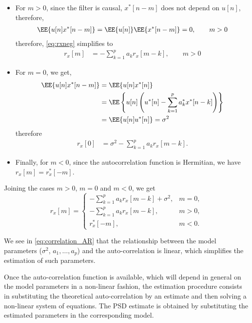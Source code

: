 \begin{itemize}
\item For $m>0$, since the filter is causal, $x^{\ast}[n-m]$ does not depend on $u[n]$, therefore,
\begin{align}
\EE\{ u[n] x^{\ast}[n-m] \}  
    = \EE\{u[n]\} \EE\{x^{\ast}[n-m] \} 
    = 0,  \qquad m>0 
\end{align}
therefore, \eqref{eq:rxneg} simplifies to
\begin{align*}
r_x[m] &= - \sum_{k=1}^p a_k r_x[m-k],   \qquad m>0
\end{align*}
\item For $m=0$, we get,
\begin{align}
\EE\{ u[n] x^{\ast}[n-m] \}  
	&= \EE\{ u[n] x^{\ast}[n] \}                                                               \nonumber\\
	&= \EE\left\{ u[n] \left(u^\ast[n] - \sum_{k=1}^{p} a_k^\ast x^\ast[n-k] \right) \right\}   \nonumber\\
	&= \EE\{ u[n] u^\ast[n] \}
	= \sigma^2
\end{align}
therefore
\begin{align*}
\label{eq:rxzero}
r_{x}[0] &= \sigma^2 - \sum_{k=1}^p a_k r_x[m-k].
\end{align*}
\item Finally, for $m<0$, since the autocorrelation function is Hermitian, we have $r_x[m] = r_x^\ast[-m]$. 
\end{itemize}

Joining the cases $m>0$, $m=0$ and $m<0$, we get
\begin{equation}
\label{eq:correlation_AR}
r_{x}[m] = 
\begin{cases}
\displaystyle - \sum_{k=1}^p a_k r_x[m-k] + \sigma^2,  & m = 0, \\ 
\displaystyle - \sum_{k=1}^p a_k r_x[m-k],             & m > 0, \\
r_{x}^{\ast}[-m],                                      & m < 0.
\end{cases}
\end{equation}

We see in \eqref{eq:correlation_AR} that the relationship between the model parameters ($\sigma^2$, $a_1, \ldots, a_p$) and the auto-correlation is linear, which simplifies the estimation of such parameters.

Once the auto-correlation function is available, which will depend in general on the model parameters in a non-linear fashion, the estimation procedure consists in substituting the theoretical auto-correlation by an estimate and then solving a non-linear system of equations. The PSD estimate is obtained by substituting the estimated parameters in the corresponding model.


